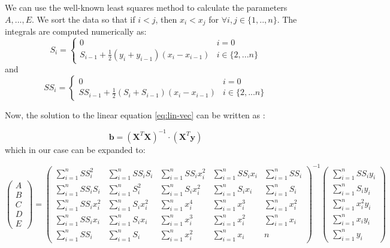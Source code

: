 We can use the well-known least squares method to calculate the parameters $A,...,E$. We sort the data so that if $i<j$, then $x_i<x_j$ for $\forall i,j \in \{1,..,n\}$. The integrals are computed numerically as:
\begin{equation}
	S_i = \left\{
	\begin{array}{ll}
		0 & i=0 \\
		S_{i-1} + \frac{1}{2}(y_i+y_{i-1})(x_i-x_{i-1}) & i\in\{2,...n\}
	\end{array}
	\right.
\end{equation}
and
\begin{equation}
	SS_i = \left\{
	\begin{array}{ll}
		0 & i=0 \\
		SS_{i-1} + \frac{1}{2}(S_i+S_{i-1})(x_i-x_{i-1}) & i\in\{2,...n\}
	\end{array}
	\right.
\end{equation}

Now, the solution to the linear equation \ref{eq:lin-vec} can be written as \cite{lin-reg}:

\begin{equation}
	\boldsymbol{b}=\left(\boldsymbol{X}^T\boldsymbol{X}\right)^{-1}\cdot (\boldsymbol{X}^T\boldsymbol{y})
\end{equation}
which in our case can be expanded to:

\begin{equation}
	\label{eq:lin-reg}
	\begin{pmatrix}
		A \\
		B \\
		C \\
		D \\
		E  
	\end{pmatrix} 
	=
	\begin{pmatrix}
		\sum\limits_{i=1}^nSS_i^2 & \sum\limits_{i=1}^nSS_iS_i & \sum\limits_{i=1}^nSS_ix_i^2 & \sum\limits_{i=1}^nSS_ix_i & \sum\limits_{i=1}^nSS_i \\
		\sum\limits_{i=1}^nSS_iS_i & \sum\limits_{i=1}^nS_i^2 & \sum\limits_{i=1}^nS_ix_i^2 & \sum\limits_{i=1}^nS_ix_i & \sum\limits_{i=1}^nS_i \\
		\sum\limits_{i=1}^nSS_ix_i^2 & \sum\limits_{i=1}^nS_ix_i^2 & \sum\limits_{i=1}^nx_i^4 & \sum\limits_{i=1}^nx_i^3 & \sum\limits_{i=1}^nx_i^2 \\
		\sum\limits_{i=1}^nSS_ix_i & \sum\limits_{i=1}^nS_ix_i & \sum\limits_{i=1}^nx_i^3 & \sum\limits_{i=1}^nx_i^2 & \sum\limits_{i=1}^nx_i \\
		\sum\limits_{i=1}^nSS_i & \sum\limits_{i=1}^nS_i & \sum\limits_{i=1}^nx_i^2 & \sum\limits_{i=1}^nx_i & n  
	\end{pmatrix}^{-1}
	\begin{pmatrix}
		\sum\limits_{i=1}^nSS_iy_i \\
		\sum\limits_{i=1}^nS_iy_i \\
		\sum\limits_{i=1}^nx_i^2y_i \\
		\sum\limits_{i=1}^nx_iy_i \\
		\sum\limits_{i=1}^ny_i  
	\end{pmatrix}
\end{equation}

